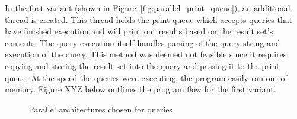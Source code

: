 \documentclass[11pt,journal,compsoc]{IEEEtran}
\begin{document}
In the first variant (shown in Figure~\ref{fig:parallel_print_queue}), an additional thread is created. This thread holds the print queue which accepts queries that have finished execution and will print out results based on the result set’s contents. The query execution itself handles parsing of the query string and execution of the query. This method was deemed not feasible since it requires copying and storing the result set into the query and passing it to the print queue. At the speed the queries were executing, the program easily ran out of memory. Figure XYZ below outlines the program flow for the first variant.

\begin{figure}
\captionsetup{justification=centering}
\centerline{
\hfill
{}}
\caption{Parallel architectures chosen for queries}
\label{fig:parallel_query}
\end{figure} 
\end{document}
